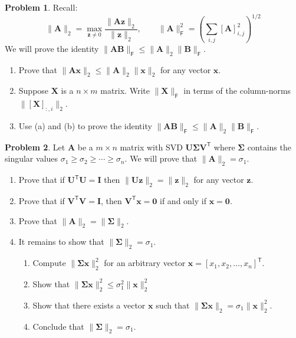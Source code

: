 \documentclass[12pt]{article}
\theoremstyle{definition}
\newtheorem{problem}{Problem}
\renewcommand{\vec}{\mathbf}
\newcommand{\T}{\mathsf{T}}
\newcommand{\F}{\mathsf{F}}
\begin{document}
\hfill

\begin{problem}
Recall:
\[
\| \vec{A} \|_2 = \max_{\vec{z} \neq 0} \frac{\| \vec{A}\vec{z} \|_2}{\| \vec{z} \|_2}
,\qquad
\| \vec{A} \|_\F^2 = \left( \sum_{i,j} [\vec{A}]_{i,j}^2 \right)^{1/2}
\]
We will prove the identity $\|\vec{A}\vec{B}\|_\F \leq \|\vec{A}\|_2 \| \vec{B} \|_\F$.
\begin{enumerate}
    \item 
        Prove that $\| \vec{A}\vec{x} \|_2 \leq \|\vec{A}\|_2 \|\vec{x}\|_2$ for any vector $\vec{x}$.
    \item 
        Suppose $\vec{X}$ is a $n\times m$ matrix. 
        Write $\|\vec{X}\|_\F$ in terms of the column-norms $\|[\vec{X}]_{:,i}\|_2$.
    \item Use (a) and (b) to prove the identity $\|\vec{A}\vec{B}\|_\F \leq \|\vec{A}\|_2 \| \vec{B} \|_\F$.
\end{enumerate}

\end{problem}

\clearpage
\begin{problem}
    Let $\vec{A}$ be a $m\times n$ matrix with SVD $\vec{U}\vec{\Sigma}\vec{V}^\T$ where $\vec{\Sigma}$ contains the singular values $\sigma_1 \geq \sigma_2 \geq \cdots \geq \sigma_n$.
    We will prove that $\|\vec{A}\|_2 = \sigma_1$.
    \begin{enumerate}
        \item Prove that if $\vec{U}^\T\vec{U} = \vec{I}$ then $\|\vec{U}\vec{z}\|_2 = \|\vec{z}\|_2$ for any vector $\vec{z}$.
        \item Prove that if $\vec{V}^\T\vec{V} = \vec{I}$, then $\vec{V}^\T \vec{x} = \vec{0}$ if and only if $\vec{x} = \vec{0}$.
        \item Prove that $\|\vec{A}\|_2 = \|\vec{\Sigma}\|_2$.
        \item It remains to show that $\|\vec{\Sigma}\|_2 = \sigma_1$.
        \begin{enumerate}[label=(\roman*)]
            \item  Compute $\|\vec{\Sigma}\vec{x}\|_2^2$ for an arbitrary vector $\vec{x} = [x_1, x_2, \ldots, x_n]^\T$.
            \item Show that $\|\vec{\Sigma}\vec{x}\|_2^2 \leq \sigma_1^2 \| \vec{x}\|_2^2$
            \item Show that there exists a vector $\vec{x}$ such that $\|\vec{\Sigma}\vec{x}\|_2 = \sigma_1 \| \vec{x}\|_2^2$.
            \item Conclude that $\|\vec{\Sigma}\|_2 = \sigma_1$.
        \end{enumerate}

    \end{enumerate}
\end{problem}
\end{document}
